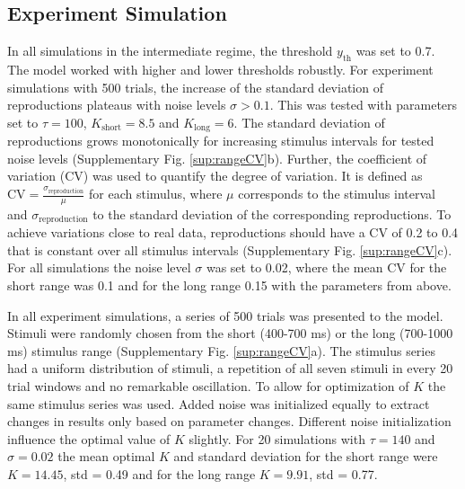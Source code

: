 \documentclass[10pt]{article}
\begin{document}
\subsection*{Experiment Simulation}
In all simulations in the intermediate regime, the threshold $y_\text{th}$ was set to 0.7. The model worked with higher and lower thresholds robustly.  
For experiment simulations with 500 trials, the increase of the standard deviation of reproductions plateaus with noise levels $\sigma > 0.1$. This was tested with parameters set to $\tau=100$, $K_\text{short}=8.5$ and $K_\text{long}=6$.
The standard deviation of reproductions grows monotonically for increasing stimulus intervals for tested noise levels (Supplementary Fig. \ref{sup:rangeCV}b).
Further, the coefficient of variation (CV) was used to quantify the degree of variation. It is defined as $\text{CV}=\frac{\sigma_\text{reproduction}}{\mu}$ for each stimulus, where $\mu$ corresponds to the stimulus interval and $\sigma_\text{reproduction}$ to the standard deviation of the corresponding reproductions. 
To achieve variations close to real data, reproductions should have a CV of 0.2 to 0.4 that is constant over all stimulus intervals (Supplementary Fig. \ref{sup:rangeCV}c).
For all simulations the noise level $\sigma$ was set to 0.02, where the mean CV for the short range was 0.1 and for the long range 0.15 with the parameters from above.

In all experiment simulations, a series of 500 trials was presented to the model.
Stimuli were randomly chosen from the short (400-700 ms) or the long (700-1000 ms) stimulus range (Supplementary Fig. \ref{sup:rangeCV}a).
The stimulus series had a uniform distribution of stimuli, a repetition of all seven stimuli in every 20 trial windows and no remarkable oscillation.
To allow for optimization of $K$ the same stimulus series was used. Added noise was initialized equally to extract changes in results only based on parameter changes.
Different noise initialization influence the optimal value of $K$ slightly. For 20 simulations with $\tau=140$ and $\sigma=0.02$ the mean optimal $K$ and standard deviation for the short range were $K = 14.45$, std = 0.49 and for the long range $K = 9.91$, std = 0.77. 
\end{document}
